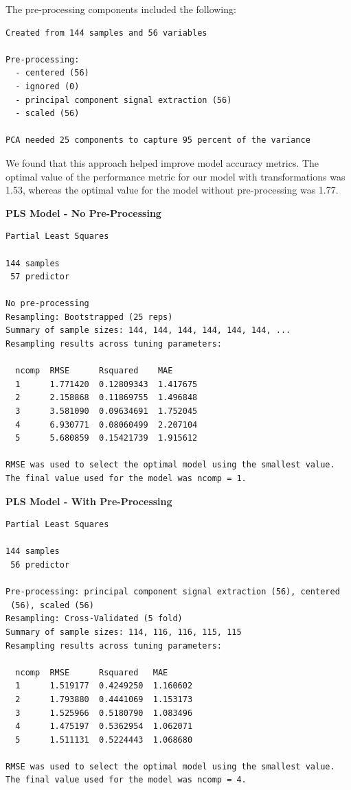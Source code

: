 \documentclass[]{report}
\begin{document}
The pre-processing components included the following:

\begin{verbatim}
Created from 144 samples and 56 variables

Pre-processing:
  - centered (56)
  - ignored (0)
  - principal component signal extraction (56)
  - scaled (56)

PCA needed 25 components to capture 95 percent of the variance
\end{verbatim}

We found that this approach helped improve model accuracy metrics. The
optimal value of the performance metric for our model with
transformations was 1.53, whereas the optimal value for the model
without pre-processing was 1.77.

\textbf{PLS Model - No Pre-Processing}

\begin{verbatim}
Partial Least Squares 

144 samples
 57 predictor

No pre-processing
Resampling: Bootstrapped (25 reps) 
Summary of sample sizes: 144, 144, 144, 144, 144, 144, ... 
Resampling results across tuning parameters:

  ncomp  RMSE      Rsquared    MAE     
  1      1.771420  0.12809343  1.417675
  2      2.158868  0.11869755  1.496848
  3      3.581090  0.09634691  1.752045
  4      6.930771  0.08060499  2.207104
  5      5.680859  0.15421739  1.915612

RMSE was used to select the optimal model using the smallest value.
The final value used for the model was ncomp = 1.
\end{verbatim}

\textbf{PLS Model - With Pre-Processing}

\begin{verbatim}
Partial Least Squares 

144 samples
 56 predictor

Pre-processing: principal component signal extraction (56), centered
 (56), scaled (56) 
Resampling: Cross-Validated (5 fold) 
Summary of sample sizes: 114, 116, 116, 115, 115 
Resampling results across tuning parameters:

  ncomp  RMSE      Rsquared   MAE     
  1      1.519177  0.4249250  1.160602
  2      1.793880  0.4441069  1.153173
  3      1.525966  0.5180790  1.083496
  4      1.475197  0.5362954  1.062071
  5      1.511131  0.5224443  1.068680

RMSE was used to select the optimal model using the smallest value.
The final value used for the model was ncomp = 4.
\end{verbatim}
\end{document}
